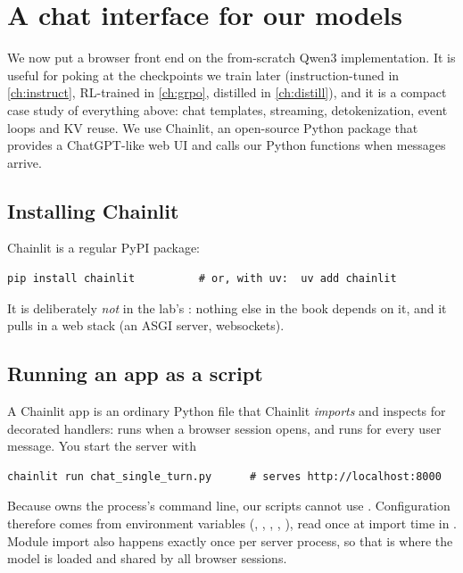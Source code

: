 \section{A chat interface for our models}\label{sec:efficient:chat}

We now put a browser front end on the from-scratch Qwen3 implementation. It is useful
for poking at the checkpoints we train later (instruction-tuned in \cref{ch:instruct},
RL-trained in \cref{ch:grpo}, distilled in \cref{ch:distill}), and it is a compact case
study of everything above: chat templates, streaming, detokenization, event loops and KV
reuse. We use Chainlit, an open-source Python package that provides a ChatGPT-like web
UI and calls our Python functions when messages arrive.

\subsection{Installing Chainlit}
Chainlit is a regular PyPI package:
\begin{lstlisting}[style=shell]
pip install chainlit          # or, with uv:  uv add chainlit
\end{lstlisting}
It is deliberately \emph{not} in the lab's : nothing else in the
book depends on it, and it pulls in a web stack (an ASGI server, websockets).

\subsection{Running an app as a script}
A Chainlit app is an ordinary Python file that Chainlit \emph{imports} and inspects
for decorated handlers:  runs when a browser session opens,
and  runs for every user message. You start the server with
\begin{lstlisting}[style=shell]
chainlit run chat_single_turn.py      # serves http://localhost:8000
\end{lstlisting}
Because  owns the process's command line, our scripts cannot use
. Configuration therefore comes from environment variables
(, , ,
, ), read once at import time in . Module import
also happens exactly once per server process, so that is where the model is loaded and
shared by all browser sessions.


